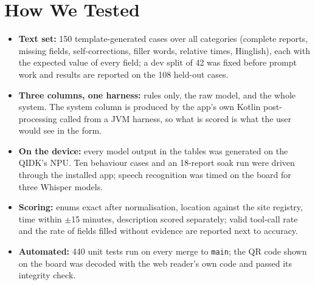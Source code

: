 \documentclass[9pt,a4paper]{extarticle}
\newcommand{\code}[1]{{\small\texttt{#1}}}
\begin{document}
\section{How We Tested}
\begin{itemize}
\item \textbf{Text set:} 150 template-generated cases over all categories (complete reports, missing fields, self-corrections, filler words, relative times, Hinglish), each with the expected value of every field; a dev split of 42 was fixed before prompt work and results are reported on the 108 held-out cases.
\item \textbf{Three columns, one harness:} rules only, the raw model, and the whole system. The system column is produced by the app's own Kotlin post-processing called from a JVM harness, so what is scored is what the user would see in the form.
\item \textbf{On the device:} every model output in the tables was generated on the QIDK's NPU. Ten behaviour cases and an 18-report soak run were driven through the installed app; speech recognition was timed on the board for three Whisper models.
\item \textbf{Scoring:} enums exact after normalisation, location against the site registry, time within $\pm$15 minutes, description scored separately; valid tool-call rate and the rate of fields filled without evidence are reported next to accuracy.
\item \textbf{Automated:} 440 unit tests run on every merge to \code{main}; the QR code shown on the board was decoded with the web reader's own code and passed its integrity check.
\end{itemize}
\end{document}
